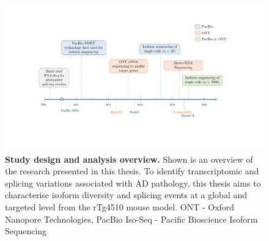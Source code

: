 \begin{landscape}
	\begin{figure}[htb]
		\begin{center}
			\includegraphics[page=2,trim={0 0 0 0},clip,scale = 0.7]{Figures/Introduction_Figures_Landscape.pdf}
		\end{center}
		\captionsetup{width=1.5\textwidth}
		\caption[Study design and analysis overview]%
		{\textbf{Study design and analysis overview.} Shown is an overview of the research presented in this thesis. To identify transcriptomic and splicing variations associated with AD pathology, this thesis aims to characterise isoform diversity and splicing events at a global and targeted level from the rTg4510 mouse model. ONT - Oxford Nanopore Technologies, PacBio Iso-Seq - Pacific Bioscience Isoform Sequencing}
		\label{fig:studydesign}
	\end{figure} 	
\end{landscape}